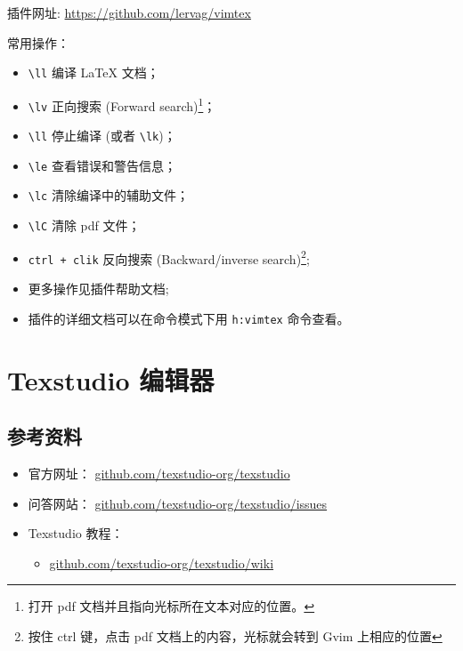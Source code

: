 \documentclass[
    11pt,
    cite=authoryear,
    device=phone,
    lang=cn,
    mode=simple,
    result=answer,
    toc=onecol,
]{elegantbook_sierxue}
\begin{document}
插件网址:
\href{https://github.com/lervag/vimtex}{https://github.com/lervag/vimtex}

常用操作：
\begin{itemize}
    \item \lstinline{\ll} 编译 \LaTeX{} 文档；
    \item \lstinline{\lv} 正向搜索 (Forward search)\footnote{
        打开 pdf 文档并且指向光标所在文本对应的位置。}；
    \item \lstinline{\ll} 停止编译 (或者 \lstinline{\lk})；
    \item \lstinline{\le} 查看错误和警告信息；
    \item \lstinline{\lc} 清除编译中的辅助文件；
    \item \lstinline{\lC} 清除 pdf 文件；
    \item \lstinline{ctrl + clik} 反向搜索 (Backward/inverse search)\footnote{
        按住 ctrl 键，点击 pdf 文档上的内容，光标就会转到 Gvim 上相应的位置};
    \item 更多操作见插件帮助文档;
    \item 插件的详细文档可以在命令模式下用 \lstinline{h:vimtex} 命令查看。
\end{itemize}

\section{Texstudio 编辑器}%
\label{sec:texstudio}

\subsection{参考资料}%
\label{sub:texstudio-refs}

\begin{itemize}
    \item 官方网址： \href{https://github.com/texstudio-org/texstudio}
        {github.com/texstudio-org/texstudio}
    \item 问答网站：
        \href{https://github.com/texstudio-org/texstudio/issues}
        {github.com/texstudio-org/texstudio/issues}
    \item Texstudio 教程：
        \begin{itemize}
            \item \href{https://github.com/texstudio-org/texstudio/wiki}
                {github.com/texstudio-org/texstudio/wiki}
        \end{itemize}
\end{itemize}
\end{document}
